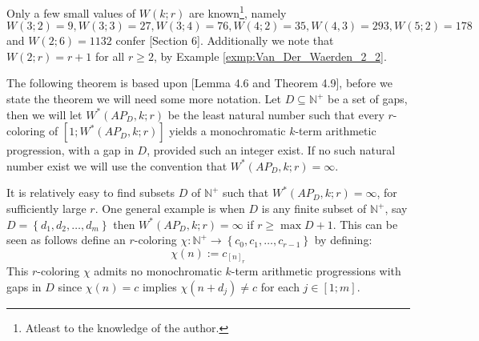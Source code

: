 Only a few small values of $W(k; r)$ are known\footnote{Atleast to the knowledge of the author.}, namely $W(3; 2) = 9, W(3; 3)= 27, W(3; 4) = 76, W(4; 2)= 35, W(4, 3) = 293, W(5; 2) = 178$ and $W(2; 6) = 1132$ confer \cite{van_der_waerden_lower_bound}[Section 6]. Additionally we note that $W(2; r) = r + 1$ for all $r \geq 2$, by Example \ref{exmp:Van_Der_Waerden_2_2}.

The following theorem is based upon \cite{rtoi}[Lemma 4.6 and Theorem 4.9], before we state the theorem we will need some more notation. Let $D \subseteq \mathbb{N}^{+}$ be a set of gaps, then we will let $W^{*}(AP_D, k; r)$ be the least natural number such that every $r$-coloring of $[1; W^{*}(AP_D, k; r)]$ yields a monochromatic $k$-term arithmetic progression, with a gap in $D$, provided such an integer exist. If no such natural number exist we will use the convention that $W^{*}(AP_D, k; r) = \infty$.

\begin{example}\label{exmp:van_der_waerden_strengthend_version}
	It is relatively easy to find subsets $D$ of $\mathbb{N}^{+}$ such that $W^{*}(AP_D, k; r) = \infty$, for sufficiently large $r$. One general example is when $D$ is any finite subset of $\mathbb{N}^{+}$, say $D = \left\{d_1, d_2, \ldots, d_{m}\right\}$ then $W^{*}(AP_D, k; r) = \infty$ if $r \geq \max D + 1$. This can be seen as follows define an $r$-coloring $\chi: \mathbb{N^{+}} \to \left\{c_0, c_1, \ldots, c_{r - 1}\right\}$ by defining:
	\begin{equation*}
		\chi(n) := c_{[n]_{r}}
	\end{equation*}
	This $r$-coloring $\chi$ admits no monochromatic $k$-term arithmetic progressions with gaps in $D$ since $\chi(n) = c$ implies $\chi(n + d_{j}) \neq c$ for each $j \in [1; m]$.
\end{example}

